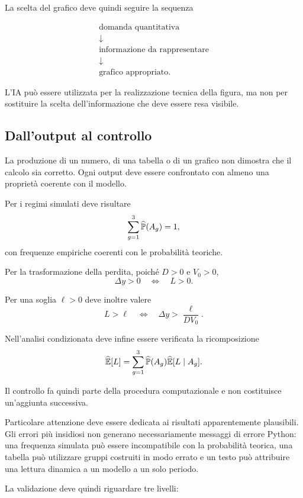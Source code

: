 La scelta del grafico deve quindi seguire la sequenza

\[
\begin{array}{c}
\text{domanda quantitativa}
\\[3pt]
\downarrow
\\[3pt]
\text{informazione da rappresentare}
\\[3pt]
\downarrow
\\[3pt]
\text{grafico appropriato}.
\end{array}
\]

L'IA pu\`{o} essere utilizzata per la realizzazione tecnica della figura, ma
non per sostituire la scelta dell'informazione che deve essere resa visibile.

\subsection{Dall'output al controllo}

La produzione di un numero, di una tabella o di un grafico non dimostra che il
calcolo sia corretto. Ogni output deve essere confrontato con almeno una
propriet\`{a} coerente con il modello.

Per i regimi simulati deve risultare
\[
\sum_{g=1}^{3}\widehat{\mathbb{P}}(A_g)=1,
\]
con frequenze empiriche coerenti con le probabilit\`{a} teoriche.

Per la trasformazione della perdita, poich\'{e} $D>0$ e $V_0>0$,
\[
\Delta y>0
\quad\Longleftrightarrow\quad
L>0.
\]

Per una soglia $\ell>0$ deve inoltre valere
\[
L>\ell
\quad\Longleftrightarrow\quad
\Delta y>\frac{\ell}{D V_0}.
\]

Nell'analisi condizionata deve infine essere verificata la ricomposizione
\[
\widehat{\mathbb{E}}[L]
=
\sum_{g=1}^{3}
\widehat{\mathbb{P}}(A_g)
\widehat{\mathbb{E}}[L\mid A_g].
\]

Il controllo fa quindi parte della procedura computazionale e non costituisce
un'aggiunta successiva.

Particolare attenzione deve essere dedicata ai risultati apparentemente
plausibili. Gli errori pi\`{u} insidiosi non generano necessariamente messaggi
di errore Python: una frequenza simulata pu\`{o} essere incompatibile con la
probabilit\`{a} teorica, una tabella pu\`{o} utilizzare gruppi costruiti in
modo errato e un testo pu\`{o} attribuire una lettura dinamica a un modello a
un solo periodo.

La validazione deve quindi riguardare tre livelli:

